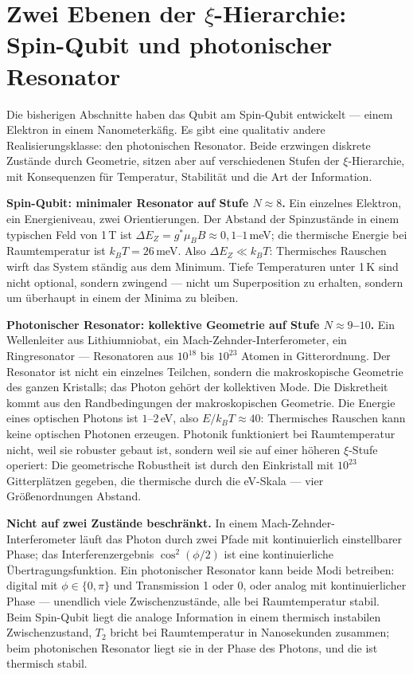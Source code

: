 \section{Zwei Ebenen der $\xi$-Hierarchie: Spin-Qubit und photonischer Resonator}

Die bisherigen Abschnitte haben das Qubit am Spin-Qubit entwickelt ---
einem Elektron in einem Nanometerkäfig. Es gibt eine qualitativ andere
Realisierungsklasse: den photonischen Resonator. Beide erzwingen
diskrete Zustände durch Geometrie, sitzen aber auf verschiedenen Stufen
der $\xi$-Hierarchie, mit Konsequenzen für Temperatur, Stabilität und
die Art der Information.

\textbf{Spin-Qubit: minimaler Resonator auf Stufe $N\approx8$.} Ein
einzelnes Elektron, ein Energieniveau, zwei Orientierungen. Der Abstand
der Spinzustände in einem typischen Feld von 1\,T ist
$\Delta E_Z = g^*\mu_BB\approx0{,}1$--$1$\,meV; die thermische Energie
bei Raumtemperatur ist $k_BT = 26$\,meV. Also $\Delta E_Z\ll k_BT$:
Thermisches Rauschen wirft das System ständig aus dem Minimum. Tiefe
Temperaturen unter 1\,K sind nicht optional, sondern zwingend --- nicht
um Superposition zu erhalten, sondern um überhaupt in einem der Minima
zu bleiben.

\textbf{Photonischer Resonator: kollektive Geometrie auf Stufe
$N\approx9$--$10$.} Ein Wellenleiter aus Lithiumniobat, ein
Mach-Zehnder-Interferometer, ein Ringresonator --- Resonatoren aus
$10^{18}$ bis $10^{23}$ Atomen in Gitterordnung. Der Resonator ist nicht
ein einzelnes Teilchen, sondern die makroskopische Geometrie des ganzen
Kristalls; das Photon gehört der kollektiven Mode. Die Diskretheit kommt
aus den Randbedingungen der makroskopischen Geometrie. Die Energie eines
optischen Photons ist $1$--$2$\,eV, also $E/k_BT\approx40$: Thermisches
Rauschen kann keine optischen Photonen erzeugen. Photonik funktioniert
bei Raumtemperatur nicht, weil sie robuster gebaut ist, sondern weil
sie auf einer höheren $\xi$-Stufe operiert: Die geometrische Robustheit
ist durch den Einkristall mit $10^{23}$ Gitterplätzen gegeben, die
thermische durch die eV-Skala --- vier Größenordnungen Abstand.

\textbf{Nicht auf zwei Zustände beschränkt.} In einem Mach-Zehnder-
Interferometer läuft das Photon durch zwei Pfade mit kontinuierlich
einstellbarer Phase; das Interferenzergebnis $\cos^2(\phi/2)$ ist eine
kontinuierliche Übertragungsfunktion. Ein photonischer Resonator kann
beide Modi betreiben: digital mit $\phi\in\{0,\pi\}$ und Transmission
1 oder 0, oder analog mit kontinuierlicher Phase --- unendlich viele
Zwischenzustände, alle bei Raumtemperatur stabil. Beim Spin-Qubit liegt
die analoge Information in einem thermisch instabilen Zwischenzustand,
$T_2$ bricht bei Raumtemperatur in Nanosekunden zusammen; beim
photonischen Resonator liegt sie in der Phase des Photons, und die ist
thermisch stabil.

